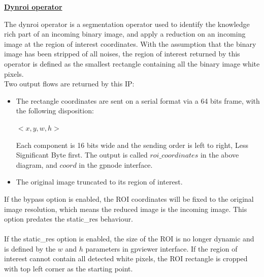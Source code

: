 \documentclass[12pt,a4paper]{article}
\begin{document}
\begin{center}
\textbf{\huge  \underline{Dynroi operator}}
\end{center}
\vspace{0.5cm}

The dynroi operator is a segmentation operator used to identify the knowledge rich part of an incoming binary image, and apply a reduction on an incoming image at the region of interest coordinates. With the assumption that the binary image has been stripped of all noises, the region of interest returned by this operator is defined as the smallest rectangle containing all the binary image white pixels.\\
Two output flows are returned by this IP: 
\begin{itemize}
\item The rectangle coordinates are sent on a serial format via a 64 bits frame, with the following disposition: \\
\begin{center}
$<x,y,w,h>$\\
\end{center}
Each component is 16 bits wide and the sending order is left to right, Less Significant Byte first. The output is called $roi\_coordinates$ in the above diagram, and $coord$ in the gpnode interface.
\item The original image truncated to its region of interest. 
\end{itemize}


If the bypass option is enabled, the ROI coordinates will be fixed to the original image resolution, which means the reduced image is the incoming image. This option predates the static\_res behaviour.\\\\
If the static\_res option is enabled, the size of the ROI is no longer dynamic and is defined by the $w$ and $h$ parameters in gpviewer interface. If the region of interest cannot contain all detected white pixels, the ROI rectangle is cropped with top left corner as the starting point.




\begin{figure}[h!]
\centering
{}
\end{figure}
\end{document}

